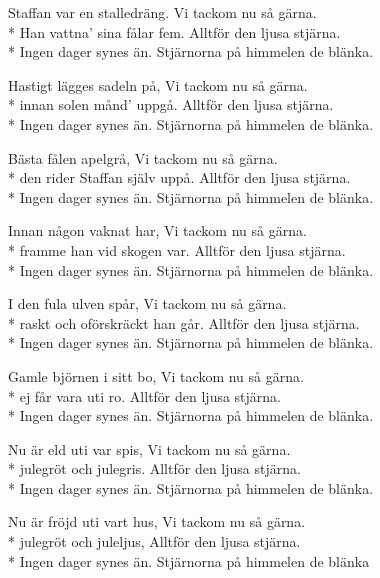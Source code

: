 \begin{SongText}[Staffansvisan]
    \begin{SongVerse}
        Staffan var en stalledräng. Vi tackom nu så gärna.\\*%
        Han vattna' sina fålar fem. Alltför den ljusa stjärna.\\*%
        Ingen dager synes än. Stjärnorna på himmelen de blänka.
    \end{SongVerse}
    \begin{SongVerse}
        Hastigt lägges sadeln på, Vi tackom nu så gärna.\\*%
        innan solen månd' uppgå. Alltför den ljusa stjärna.\\*%
        Ingen dager synes än. Stjärnorna på himmelen de blänka.
    \end{SongVerse}
    \begin{SongVerse}
        Bästa fålen apelgrå, Vi tackom nu så gärna.\\*%
        den rider Staffan själv uppå. Alltför den ljusa stjärna.\\*%
        Ingen dager synes än. Stjärnorna på himmelen de blänka.
    \end{SongVerse}
    \begin{SongVerse}
        Innan någon vaknat har, Vi tackom nu så gärna.\\*%
        framme han vid skogen var. Alltför den ljusa stjärna.\\*%
        Ingen dager synes än. Stjärnorna på himmelen de blänka.
    \end{SongVerse}
    \begin{SongVerse}
        I den fula ulven spår, Vi tackom nu så gärna.\\*%
        raskt och oförskräckt han går. Alltför den ljusa stjärna.\\*%
        Ingen dager synes än. Stjärnorna på himmelen de blänka.
    \end{SongVerse}
    \begin{SongVerse}
        Gamle björnen i sitt bo, Vi tackom nu så gärna.\\*%
        ej får vara uti ro. Alltför den ljusa stjärna.\\*%
        Ingen dager synes än. Stjärnorna på himmelen de blänka.
    \end{SongVerse}
    \begin{SongVerse}
        Nu är eld uti var spis, Vi tackom nu så gärna.\\*%
        julegröt och julegris. Alltför den ljusa stjärna.\\*%
        Ingen dager synes än. Stjärnorna på himmelen de blänka.
    \end{SongVerse}
    \begin{SongVerse}
        Nu är fröjd uti vart hus, Vi tackom nu så gärna.\\*%
        julegröt och juleljus, Alltför den ljusa stjärna.\\*%
        Ingen dager synes än. Stjärnorna på himmelen de blänka
    \end{SongVerse}
    \begin{SongVerse}
    \end{SongVerse}
\end{SongText}
